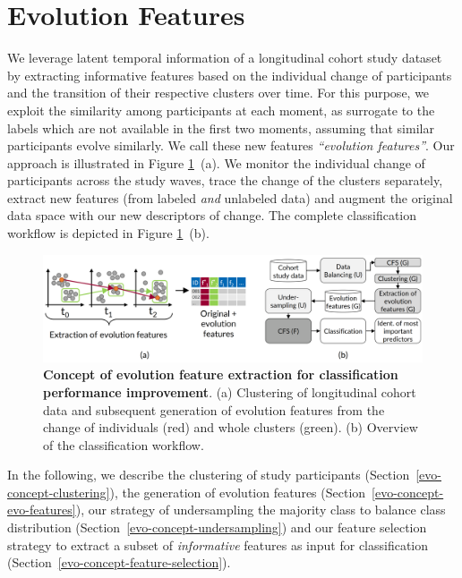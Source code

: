 \documentclass[
  oneside]{book}
\begin{document}
\hypertarget{evo-concept}{%
\section{Evolution Features}\label{evo-concept}}

We leverage latent temporal information of a longitudinal cohort study dataset by extracting informative features based on the individual change of participants and the transition of their respective clusters over time.
For this purpose, we exploit the similarity among participants at each moment, as surrogate to the labels which are not available in the first two moments, assuming that similar participants evolve similarly.
We call these new features \emph{``evolution features''}.
Our approach is illustrated in Figure \ref{fig:07-concept-workflow}~(a).
We monitor the individual change of participants across the study waves, trace the change of the clusters separately, extract new features (from labeled \emph{and} unlabeled data) and augment the original data space with our new descriptors of change.
The complete classification workflow is depicted in Figure \ref{fig:07-concept-workflow}~(b).



\begin{figure}[htbp]

{\centering \includegraphics[width=1\linewidth]{figures/07-concept-workflow} 

}

\caption{\textbf{Concept of evolution feature extraction for classification performance improvement}. (a) Clustering of longitudinal cohort data and subsequent generation of evolution features from the change of individuals (red) and whole clusters (green). (b) Overview of the classification workflow.}\label{fig:07-concept-workflow}
\end{figure}

In the following, we describe the clustering of study participants (Section~\ref{evo-concept-clustering}), the generation of evolution features (Section~\ref{evo-concept-evo-features}), our strategy of undersampling the majority class to balance class distribution (Section~\ref{evo-concept-undersampling}) and our feature selection strategy to extract a subset of \emph{informative} features as input for classification (Section~\ref{evo-concept-feature-selection}).
\end{document}

